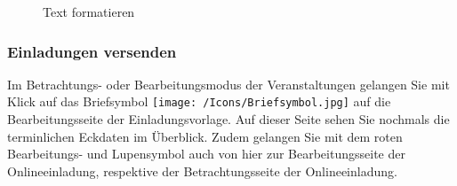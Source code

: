 \begin{figure}[H]
\caption{Text formatieren}
\end{figure}

\subsubsection{Einladungen versenden}

Im Betrachtungs- oder Bearbeitungsmodus der Veranstaltungen gelangen Sie mit Klick auf das Briefsymbol \texttt{[image: /Icons/Briefsymbol.jpg]} auf die Bearbeitungsseite der Einladungsvorlage. Auf dieser Seite sehen Sie nochmals die terminlichen Eckdaten im Überblick. Zudem gelangen Sie mit dem roten Bearbeitungs- und Lupensymbol  auch von hier zur Bearbeitungsseite der Onlineeinladung, respektive der Betrachtungsseite der Onlineeinladung. \\

